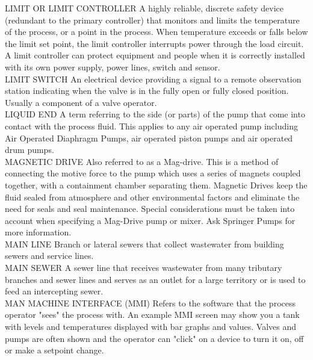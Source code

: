 \documentclass{article}
\begin{document}
LIMIT OR LIMIT CONTROLLER
A highly reliable, discrete safety device (redundant to the primary controller) that monitors and limits the temperature of the process, or a point in the process. When temperature exceeds or falls below the limit set point, the limit controller interrupts power through the load circuit. A limit controller can protect equipment and people when it is correctly installed with its own power supply, power lines, switch and sensor.
\vspace{0.3cm}\\

LIMIT SWITCH
An electrical device providing a signal to a remote observation station indicating when the valve is in the fully open or fully closed position. Usually a component of a valve operator.
\vspace{0.3cm}\\
LIQUID END
A term referring to the side (or parts) of the pump that come into contact with the process fluid. This applies to any air operated pump including Air Operated Diaphragm Pumps, air operated piston pumps and air operated drum pumps.
\vspace{0.3cm}\\
MAGNETIC DRIVE
Also referred to as a Mag-drive. This is a method of connecting the motive force to the pump which uses a series of magnets coupled together, with a containment chamber separating them. Magnetic Drives keep the fluid sealed from atmosphere and other environmental factors and eliminate the need for seals and seal maintenance. Special considerations must be taken into account when specifying a Mag-Drive pump or mixer. Ask Springer Pumps for more information.
\vspace{0.3cm}\\
MAIN LINE
Branch or lateral sewers that collect wastewater from building sewers and service lines. 
\vspace{0.3cm}\\
MAIN SEWER
A sewer line that receives wastewater from many tributary branches and sewer lines and serves as an outlet for a large territory or is used to feed an intercepting sewer. 
\vspace{0.3cm}\\
MAN MACHINE INTERFACE (MMI)
Refers to the software that the process operator "sees" the process with. An example MMI screen may show you a tank with levels and temperatures displayed with bar graphs and values. Valves and pumps are often shown and the operator can "click" on a device to turn it on, off or make a setpoint change.
\vspace{0.3cm}\\
\end{document}
